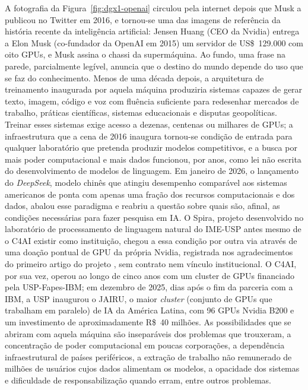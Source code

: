 A fotografia da Figura~\ref{fig:dgx1-openai} circulou pela internet depois que Musk a publicou no Twitter em 2016, e tornou-se uma das imagens de referência da história recente da inteligência artificial: Jensen Huang (CEO da Nvidia) entrega a Elon Musk (co-fundador da OpenAI em 2015) um servidor de US\$~129.000 com oito GPUs, e Musk assina o chassi da supermáquina. Ao fundo, uma frase na parede, parcialmente legível, anuncia que o destino do mundo depende do uso que se faz do conhecimento. Menos de uma década depois, a arquitetura de treinamento inaugurada por aquela máquina produziria sistemas capazes de gerar texto, imagem, código e voz com fluência suficiente para redesenhar mercados de trabalho, práticas científicas, sistemas educacionais e disputas geopolíticas. Treinar esses sistemas exige acesso a dezenas, centenas ou milhares de GPUs; a infraestrutura que a cena de 2016 inaugura tornou-se condição de entrada para qualquer laboratório que pretenda produzir modelos competitivos, e a busca por mais poder computacional e mais dados funcionou, por anos, como lei não escrita do desenvolvimento de modelos de linguagem. Em janeiro de 2026, o lançamento do \textit{DeepSeek}, modelo chinês que atingiu desempenho comparável aos sistemas americanos de ponta com apenas uma fração dos recursos computacionais e dos dados, abalou esse paradigma e reabriu a questão sobre quais são, afinal, as condições necessárias para fazer pesquisa em IA. O Spira, projeto desenvolvido no laboratório de processamento de linguagem natural do IME-USP antes mesmo de o C4AI existir como instituição, chegou a essa condição por outra via através de uma doação pontual de GPU da própria Nvidia, registrada nos agradecimentos do primeiro artigo do projeto \parencite{Casanova2021DeepLearning}, sem contrato nem vínculo institucional. O C4AI, por sua vez, operou ao longo de cinco anos com um cluster de GPUs financiado pela USP-Fapes-IBM; em dezembro de 2025, dias após o fim da parceria com a IBM, a USP inaugurou o JAIRU, o maior \textit{cluster} (conjunto de GPUs que trabalham em paralelo) de IA da América Latina, com 96 GPUs Nvidia B200 e um investimento de aproximadamente R\$~40 milhões. As possibilidades que se abriram com aquela máquina são inseparáveis dos problemas que trouxeram, a concentração de poder computacional em poucas corporações, a dependência infraestrutural de países periféricos, a extração de trabalho não remunerado de milhões de usuários cujos dados alimentam os modelos, a opacidade dos sistemas e dificuldade de responsabilização quando erram, entre outros problemas. 

